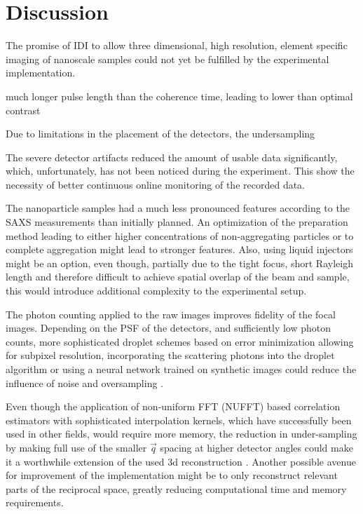 \chapter{Discussion}
The promise of IDI to allow three dimensional, high resolution, element specific imaging of nanoscale samples could not yet be fulfilled by the experimental implementation.

 
much longer pulse length than the coherence time, leading to lower than optimal contrast

Due to limitations in the placement of the detectors, the undersampling


The severe detector artifacts reduced the amount of usable data significantly, which, unfortunately, has not been noticed during the experiment. This show the necessity of better continuous online monitoring of the recorded data.


The nanoparticle samples had a much less pronounced features according to the SAXS measurements than initially planned. An optimization of the preparation method leading to either higher concentrations of non-aggregating particles or to complete aggregation might lead to stronger features. Also, using liquid injectors might be an option, even though, partially due to the tight focus, short Rayleigh length and therefore difficult to achieve spatial overlap of the beam and sample, this would introduce additional complexity to the experimental setup.





The photon counting applied to the raw images improves fidelity of the focal images. Depending on the PSF of the detectors, and sufficiently low photon counts, more sophisticated droplet schemes based on error minimization allowing for subpixel resolution, incorporating the scattering photons into the droplet algorithm or using a neural network trained on synthetic images could reduce the influence of noise and oversampling \cite{baumann2018,collaboration2014,schayck2020,sun2020}.

Even though the application of non-uniform FFT (NUFFT) based correlation estimators with sophisticated interpolation kernels, which have  successfully been used in other fields, would require more memory, the reduction in under-sampling by making full use of the smaller $\vec{q}$ spacing at higher detector angles could make it a worthwhile extension of the used 3d reconstruction \cite{laguna1998,yang2008,chang2020}. Another possible avenue for improvement of the implementation might be to only reconstruct relevant parts of the reciprocal space, greatly reducing computational time and memory requirements. 



